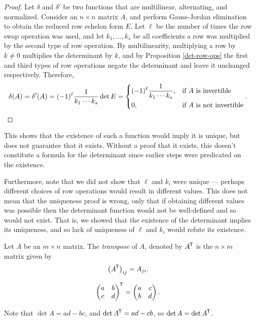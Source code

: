 \begin{proof}
    Let $\delta$ and $\delta'$ be two functions that are multilinear, alternating, and normalized. Consider an $n \times n$ matrix $A$, and perform Gauss-Jordan elimination to obtain the reduced row echelon form $E$. Let $\ell$ be the number of times the row swap operation was used, and let $k_1, \ldots, k_s$ be all coefficients a row was multiplied by the second type of row operation. By multilinearity, multiplying a row by $k \neq 0$ multiplies the determinant by $k$, and by Proposition \ref{det-row-ops} the first and third types of row operations negate the determinant and leave it unchanged respectively. Therefore,
    \[\delta(A) = \delta'(A) = (-1)^{\ell}\frac{1}{k_1\cdots k_s}\det E = \begin{dcases}
        (-1)^{\ell}\frac{1}{k_1\cdots k_s}, & \textrm{if $A$ is invertible} \\
        0, & \textrm{if $A$ is not invertible}
    \end{dcases}.\]
\end{proof}

\begin{rmk}
    This shows that the existence of such a function would imply it is unique, but does not guarantee that it exists. Without a proof that it exists, this doesn't constitute a formula for the determinant since earlier steps were predicated on the existence.

    Furthermore, note that we did not show that $\ell$ and $k_i$ were unique --- perhaps different choices of row operations would result in different values. This does not mean that the uniqueness proof is wrong, only that if obtaining different values was possible then the determinant function would not be well-defined and so would not exist. That is, we showed that the existence of the determinant implies its uniqueness, and so lack of uniqueness of $\ell$ and $k_i$ would refute its existence.
\end{rmk}

\begin{defn}
    Let $A$ be an $m \times n$ matrix. The \emph{transpose} of $A$, denoted by $A^{\mkern-1.5mu\mathsf{T}}$ is the $n \times m$ matrix given by
    \[\left(A^{\mkern-1.5mu\mathsf{T}}\right)_{ij} = A_{ji}.\]
\end{defn}

\begin{exmp}
    \[\begin{pmatrix}
        a & b \\ c & d
    \end{pmatrix}^{\mkern-1.5mu\mathsf{T}} = \begin{pmatrix}
        a & c \\ b & d
    \end{pmatrix}.\]

    Note that $\det A = ad - bc$, and $\det A^{\mkern-1.5mu\mathsf{T}} = ad - cb$, so $\det A = \det A^{\mkern-1.5mu\mathsf{T}}$.
\end{exmp}

